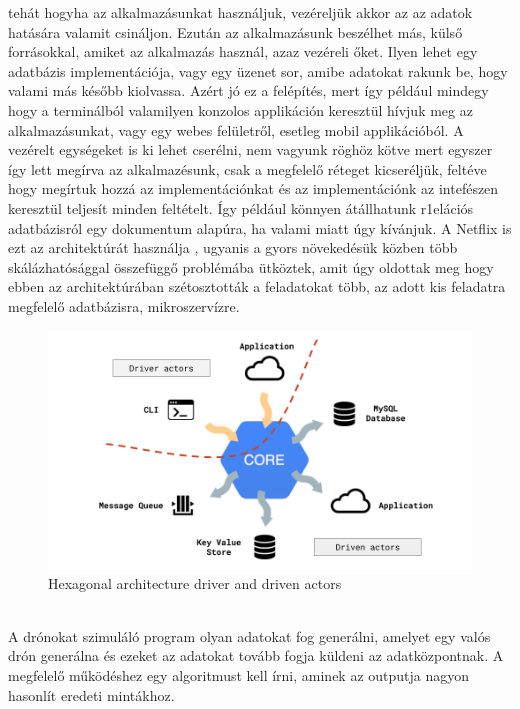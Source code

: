 tehát hogyha az alkalmazásunkat használjuk, vezéreljük akkor az az adatok hatására valamit csináljon. Ezután az alkalmazásunk beszélhet más, külső forrásokkal, amiket az alkalmazás használ, azaz vezéreli őket.
Ilyen lehet egy adatbázis implementációja, vagy egy üzenet sor, amibe adatokat rakunk be, hogy valami más később kiolvassa.
Azért jó ez a felépítés, mert így például mindegy hogy a terminálból valamilyen konzolos applikáción keresztül hívjuk meg az alkalmazásunkat,
vagy egy webes felületről, esetleg mobil applikációból. A vezérelt egységeket is ki lehet cserélni, nem vagyunk röghöz kötve
mert egyszer így lett megírva az alkalmazésunk, csak a megfelelő réteget kicseréljük, feltéve hogy megírtuk hozzá az implementációnkat és az implementációnk
az intefészen keresztül teljesít minden feltételt. Így például könnyen átállhatunk r1elációs adatbázisról egy dokumentum alapúra, ha valami miatt úgy kívánjuk.
A Netflix is ezt az architektúrát használja \cite{netflix}, ugyanis a gyors növekedésük közben több skálázhatósággal összefüggő problémába ütköztek, amit úgy oldottak meg hogy
ebben az architektúrában szétosztották a feladatokat több, az adott kis feladatra megfelelő adatbázisra, mikroszervízre.
\begin{figure}[h]
    \centering
    \includegraphics[scale=0.3]{images/hexa-actor.png}
    \caption{Hexagonal architecture driver and driven actors}
    \label{fig:hexagonal-actor}
\end{figure}
\\
A drónokat szimuláló program olyan adatokat fog generálni, amelyet egy valós drón generálna és ezeket az adatokat tovább fogja küldeni az adatközpontnak.
A megfelelő működéshez egy algoritmust kell írni, aminek az outputja nagyon hasonlít eredeti mintákhoz.

